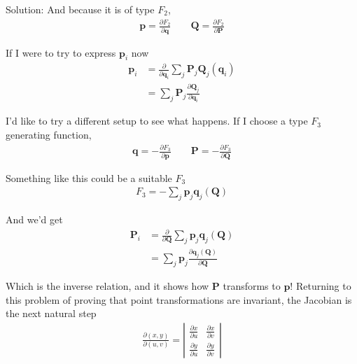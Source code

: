 \begin{homeworkProblem}
\begin{callout}{Solution:}
    And because it is of type $F_{2}$,
    \begin{align*}
        \mathbf{p} = \frac{\partial F_{2}}{\partial \mathbf{q}} \qquad \mathbf{Q} = \frac{\partial F_{2}}{\partial \mathbf{P}}
    \end{align*}

    If I were to try to express $\mathbf{p}_i$ now
    \begin{align*}
        \mathbf{p}_i &= \frac{\partial}{\partial \mathbf{q}_i} \sum_j \mathbf{P}_j \mathbf{Q}_j(\mathbf{q}_i) \\ 
                     &= \sum_j \mathbf{P}_j \frac{\partial \mathbf{Q}_j}{\partial \mathbf{q}_i}
    \end{align*}

    I'd like to try a different setup to see what happens. If I choose a type $F_{3}$ generating function,
    \begin{align*}
        \mathbf{q} = -\frac{\partial F_{3}}{\partial \mathbf{p}} \qquad \mathbf{P} = -\frac{\partial F_{3}}{\partial \mathbf{Q}}
    \end{align*}

    Something like this could be a suitable $F_{3}$
    \begin{align*}
        F_{3} = -\sum_j \mathbf{p}_j \mathbf{q}_j(\mathbf{Q})        
    \end{align*}

    And we'd get 
    \begin{align*}
        \mathbf{P}_i &= \frac{\partial}{\partial \mathbf{Q}} \sum_j \mathbf{p}_j \mathbf{q}_j(\mathbf{Q}) \\
        &= \sum_j \mathbf{p}_j  \frac{\partial \mathbf{q}_j(\mathbf{Q})}{\partial \mathbf{Q}}
    \end{align*}

    Which is the inverse relation, and it shows how $\mathbf{P}$ transforms to $\mathbf{p}$! Returning to this problem of proving that point transformations are invariant, the Jacobian is the next natural step
    \begin{align*}
        \frac{\partial (x,y)}{\partial (u,v)} = \left|\begin{matrix} \frac{\partial x}{\partial u} & \frac{\partial x}{\partial v} \\ \frac{\partial y}{\partial u} & \frac{\partial y}{\partial v} \end{matrix}\right|
    \end{align*}


\end{callout}
\end{homeworkProblem}
